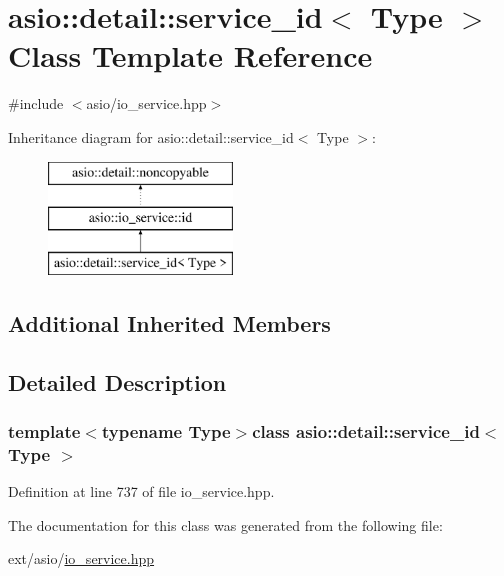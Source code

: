 \hypertarget{classasio_1_1detail_1_1service__id}{}\section{asio\+:\+:detail\+:\+:service\+\_\+id$<$ Type $>$ Class Template Reference}
\label{classasio_1_1detail_1_1service__id}


{\ttfamily \#include $<$asio/io\+\_\+service.\+hpp$>$}

Inheritance diagram for asio\+:\+:detail\+:\+:service\+\_\+id$<$ Type $>$\+:\begin{figure}[H]
\begin{center}
\leavevmode
\includegraphics[height=3.000000cm]{classasio_1_1detail_1_1service__id}
\end{center}
\end{figure}
\subsection*{Additional Inherited Members}


\subsection{Detailed Description}
\subsubsection*{template$<$typename Type$>$class asio\+::detail\+::service\+\_\+id$<$ Type $>$}



Definition at line 737 of file io\+\_\+service.\+hpp.



The documentation for this class was generated from the following file\+:\begin{DoxyCompactItemize}
\item 
ext/asio/\hyperlink{io__service_8hpp}{io\+\_\+service.\+hpp}\end{DoxyCompactItemize}
